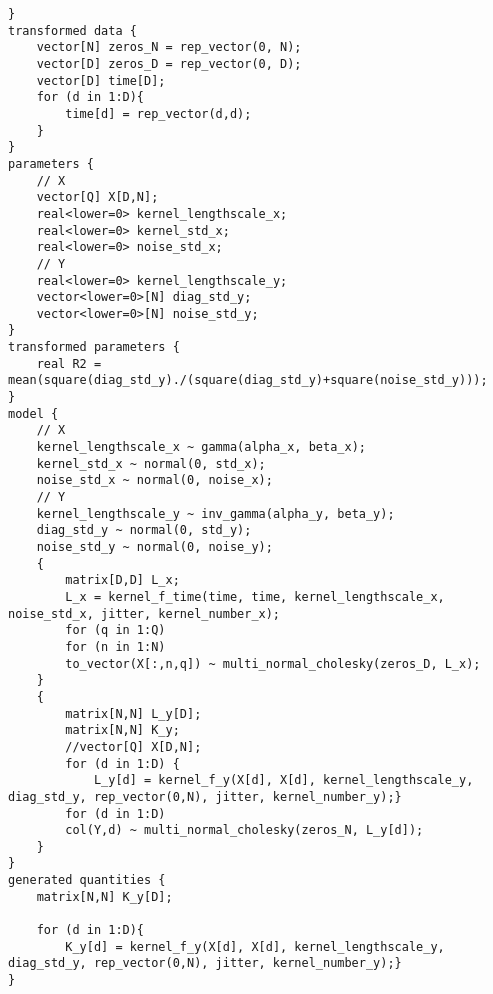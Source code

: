 \begin{lstlisting}
}
transformed data {
	vector[N] zeros_N = rep_vector(0, N);
	vector[D] zeros_D = rep_vector(0, D);
	vector[D] time[D];
	for (d in 1:D){
		time[d] = rep_vector(d,d);
	}
}
parameters {
	// X
	vector[Q] X[D,N];
	real<lower=0> kernel_lengthscale_x;
	real<lower=0> kernel_std_x;
	real<lower=0> noise_std_x;
	// Y
	real<lower=0> kernel_lengthscale_y;
	vector<lower=0>[N] diag_std_y;
	vector<lower=0>[N] noise_std_y;
}
transformed parameters {
	real R2 = mean(square(diag_std_y)./(square(diag_std_y)+square(noise_std_y)));
}
model {
	// X
	kernel_lengthscale_x ~ gamma(alpha_x, beta_x);
	kernel_std_x ~ normal(0, std_x);
	noise_std_x ~ normal(0, noise_x);
	// Y
	kernel_lengthscale_y ~ inv_gamma(alpha_y, beta_y);
	diag_std_y ~ normal(0, std_y);
	noise_std_y ~ normal(0, noise_y);
	{
		matrix[D,D] L_x;
		L_x = kernel_f_time(time, time, kernel_lengthscale_x, noise_std_x, jitter, kernel_number_x);
		for (q in 1:Q)
		for (n in 1:N)
		to_vector(X[:,n,q]) ~ multi_normal_cholesky(zeros_D, L_x);
	}
	{
		matrix[N,N] L_y[D];
		matrix[N,N] K_y;
		//vector[Q] X[D,N];
		for (d in 1:D) {
			L_y[d] = kernel_f_y(X[d], X[d], kernel_lengthscale_y, diag_std_y, rep_vector(0,N), jitter, kernel_number_y);}
		for (d in 1:D) 
		col(Y,d) ~ multi_normal_cholesky(zeros_N, L_y[d]);
	}
}
generated quantities {
	matrix[N,N] K_y[D];
	
	for (d in 1:D){
		K_y[d] = kernel_f_y(X[d], X[d], kernel_lengthscale_y, diag_std_y, rep_vector(0,N), jitter, kernel_number_y);}
}
\end{lstlisting}
\cleardoubleoddpage

